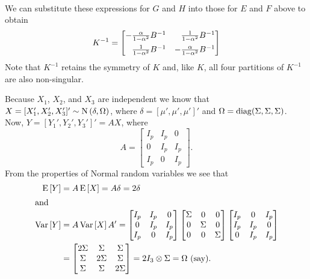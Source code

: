 \begin{enumerate}
\begin{gather*}
         \end{gather*}
         We can substitute these expressions for \( G \) and \( H \) into those for \( E \) and \( 
         F \) above to obtain
         \[
            K^{-1}=
            \begin{bmatrix}
               -\tfrac{\alpha}{1-\alpha^{2}}B^{-1} & \hphantom{-}\tfrac{1}{1-\alpha^{2}}B^{-1} \\[5pt]
               \hphantom{-}\tfrac{1}{1-\alpha^{2}}B^{-1} & -\tfrac{\alpha}{1-\alpha^{2}}B^{-1}
            \end{bmatrix}
         \]
         Note that \( K^{-1} \) retains the symmetry of \( K \) and, like \( K \), all four
         partitions of \( K^{-1} \) are also non-singular.  
         
         \solution
         Because \( X_{1} \), \( X_{2} \), and \( X_{3} \) are independent we know that \( 
         X=[X_{1}',X_{2}',X_{3}']'\sim\operatorname{N}\left(\delta,\Omega\right) \), where \( 
         \delta=[\mu',\mu',\mu']' \) and \( \Omega=\operatorname{diag}(\Sigma,\Sigma,\Sigma) \). Now, \( 
         Y=[Y_{1}',Y_{2}',Y_{3}']'=AX \), where
         \[ A=
            \begin{bmatrix}
               I_{p} & I_{p} & 0 \\
               0 & I_{p} & I_{p} \\
               I_{p} & 0 & I_{p}
            \end{bmatrix}.
         \]
         From the properties of Normal random variables we see that 
         \begin{align*}
            \operatorname{E}\left[Y\right] & =A\operatorname{E}\left[X\right]=A\delta=2\delta \\
            \shortintertext{and}
            \operatorname{Var}\left[Y\right] & =A\operatorname{Var}\left[X\right]A'=
            \begin{bmatrix}
               I_{p} & I_{p} & 0 \\
               0 & I_{p} & I_{p} \\
               I_{p} & 0 & I_{p}
            \end{bmatrix}
            \begin{bmatrix}
               \Sigma & 0 & 0 \\
               0 & \Sigma & 0 \\
               0 & 0 & \Sigma
            \end{bmatrix}
            \begin{bmatrix}
               I_{p} & 0 & I_{p} \\
               I_{p} & I_{p} & 0 \\
               0 & I_{p} & I_{p}
            \end{bmatrix}
            \\
            & =
            \begin{bmatrix}
               2\Sigma & \Sigma & \Sigma \\
               \Sigma & 2\Sigma & \Sigma \\
               \Sigma & \Sigma & 2\Sigma
            \end{bmatrix}
            =2I_{3}\otimes\Sigma=\Omega\text{ (say)}.
         \end{align*}
         

\end{enumerate}
